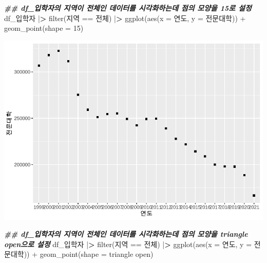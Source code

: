 \documentclass[
]{article}
\newenvironment{Shaded}{\begin{snugshade}}{\end{snugshade}}
\newcommand{\AttributeTok}[1]{\textcolor[rgb]{0.77,0.63,0.00}{#1}}
\newcommand{\DecValTok}[1]{\textcolor[rgb]{0.00,0.00,0.81}{#1}}
\newcommand{\DocumentationTok}[1]{\textcolor[rgb]{0.56,0.35,0.01}{\textbf{\textit{#1}}}}
\newcommand{\ErrorTok}[1]{\textcolor[rgb]{0.64,0.00,0.00}{\textbf{#1}}}
\newcommand{\FunctionTok}[1]{\textcolor[rgb]{0.00,0.00,0.00}{#1}}
\newcommand{\NormalTok}[1]{#1}
\newcommand{\SpecialCharTok}[1]{\textcolor[rgb]{0.00,0.00,0.00}{#1}}
\newcommand{\StringTok}[1]{\textcolor[rgb]{0.31,0.60,0.02}{#1}}
\begin{document}
\begin{Shaded}
\begin{Highlighting}[]
\DocumentationTok{\#\# df\_입학자의 지역이 \textquotesingle{}전체\textquotesingle{}인 데이터를 시각화하는데 점의 모양을 15로 설정}
\NormalTok{df\_입학자 }\SpecialCharTok{|}\ErrorTok{\textgreater{}} \FunctionTok{filter}\NormalTok{(지역 }\SpecialCharTok{==} \StringTok{\textquotesingle{}전체\textquotesingle{}}\NormalTok{) }\SpecialCharTok{|}\ErrorTok{\textgreater{}}
  \FunctionTok{ggplot}\NormalTok{(}\FunctionTok{aes}\NormalTok{(}\AttributeTok{x =}\NormalTok{ 연도, }\AttributeTok{y =}\NormalTok{ 전문대학)) }\SpecialCharTok{+}
  \FunctionTok{geom\_point}\NormalTok{(}\AttributeTok{shape =} \DecValTok{15}\NormalTok{)}
\end{Highlighting}
\end{Shaded}

\includegraphics{chap3_files/figure-latex/unnamed-chunk-15-1.pdf}

\begin{Shaded}
\begin{Highlighting}[]
\DocumentationTok{\#\# df\_입학자의 지역이 \textquotesingle{}전체\textquotesingle{}인 데이터를 시각화하는데 점의 모양을 \textquotesingle{}triangle open\textquotesingle{}으로 설정}
\NormalTok{df\_입학자 }\SpecialCharTok{|}\ErrorTok{\textgreater{}} \FunctionTok{filter}\NormalTok{(지역 }\SpecialCharTok{==} \StringTok{\textquotesingle{}전체\textquotesingle{}}\NormalTok{) }\SpecialCharTok{|}\ErrorTok{\textgreater{}}
  \FunctionTok{ggplot}\NormalTok{(}\FunctionTok{aes}\NormalTok{(}\AttributeTok{x =}\NormalTok{ 연도, }\AttributeTok{y =}\NormalTok{ 전문대학)) }\SpecialCharTok{+}
  \FunctionTok{geom\_point}\NormalTok{(}\AttributeTok{shape =} \StringTok{\textquotesingle{}triangle open\textquotesingle{}}\NormalTok{)}
\end{Highlighting}
\end{Shaded}
\end{document}
